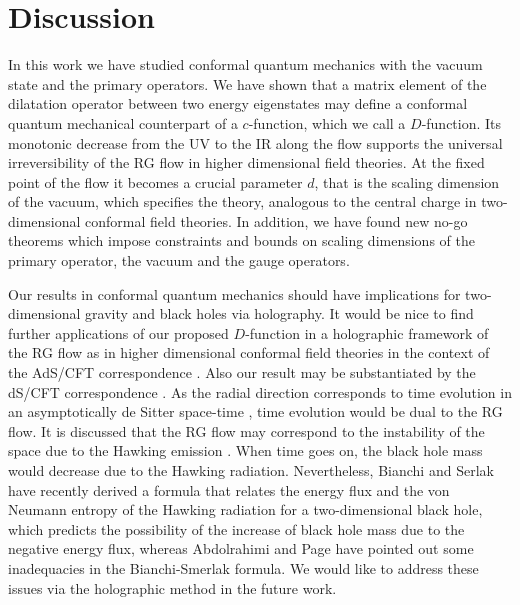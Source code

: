 \documentclass[12pt]{article}
\numberwithin{equation}{section}
\begin{document}
\section{Discussion}
\label{dissec}
In this work we have studied conformal quantum mechanics 
with the vacuum state and the primary operators. 
We have shown that 
a matrix element of the dilatation operator 
between two energy eigenstates may define a 
conformal quantum mechanical counterpart of a $c$-function, 
which we call a $D$-function. 
Its monotonic decrease from the UV to the IR 
along the flow supports the universal irreversibility 
of the RG flow in higher dimensional field theories. 
At the fixed point of the flow 
it becomes a crucial parameter $d$, that is the scaling dimension of the vacuum, 
which specifies the theory, analogous to the central charge 
in two-dimensional conformal field theories. 
%
In addition, we have found new no-go theorems 
which impose constraints and bounds on scaling dimensions 
of the primary operator, the vacuum and the gauge operators. 



Our results in conformal quantum mechanics should have implications 
for two-dimensional gravity and black holes via holography. 
It would be nice to find further applications of our proposed $D$-function 
in a holographic framework of the RG flow 
as in higher dimensional conformal field theories in the context of the AdS/CFT correspondence 
\cite{Freedman:1999gp,Myers:2010xs}. 
Also our result may be substantiated by the dS/CFT correspondence \cite{Strominger:2001pn}. 
As the radial direction corresponds to time evolution in an asymptotically de Sitter space-time \cite{Strominger:2001pn, Balasubramanian:2002zh}, 
time evolution would be dual to the RG flow. 
It is discussed \cite{Halyo:2001cu} that 
the RG flow may correspond to the instability of the space due to the Hawking emission \cite{Hawking:1974sw}. 
When time goes on, the black hole mass would decrease due to the Hawking radiation. 
Nevertheless, Bianchi and Serlak \cite{Bianchi:2014qua,Bianchi:2014vea} 
have recently derived a formula that relates 
the energy flux and the von Neumann entropy of the Hawking radiation 
for a two-dimensional black hole, which predicts the possibility of the increase of black hole mass due to the negative energy flux, 
whereas Abdolrahimi and Page \cite{Abdolrahimi:2015tha} 
have pointed out some inadequacies in the Bianchi-Smerlak formula. 
We would like to address these issues via the holographic method in the future work. 
\end{document}
